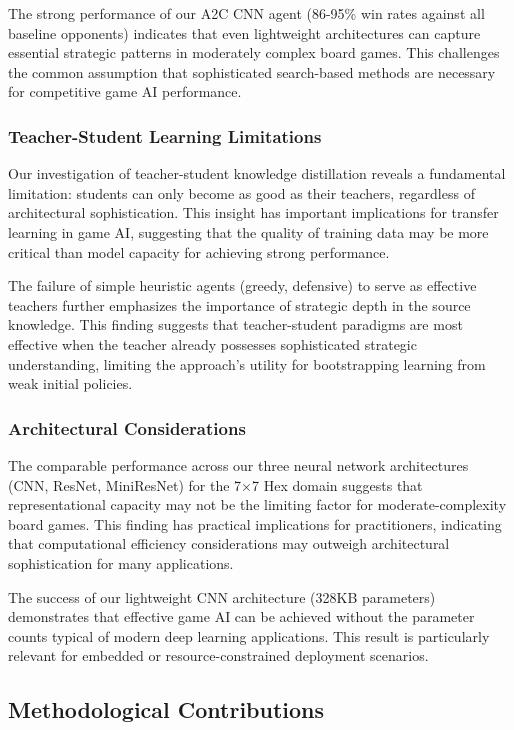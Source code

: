 \documentclass[conference]{IEEEtran}
\begin{document}
The strong performance of our A2C CNN agent (86-95\% win rates against all baseline opponents) indicates that even lightweight architectures can capture essential strategic patterns in moderately complex board games. This challenges the common assumption that sophisticated search-based methods are necessary for competitive game AI performance.

\subsubsection{Teacher-Student Learning Limitations}

Our investigation of teacher-student knowledge distillation reveals a fundamental limitation: students can only become as good as their teachers, regardless of architectural sophistication. This insight has important implications for transfer learning in game AI, suggesting that the quality of training data may be more critical than model capacity for achieving strong performance.

The failure of simple heuristic agents (greedy, defensive) to serve as effective teachers further emphasizes the importance of strategic depth in the source knowledge. This finding suggests that teacher-student paradigms are most effective when the teacher already possesses sophisticated strategic understanding, limiting the approach's utility for bootstrapping learning from weak initial policies.

\subsubsection{Architectural Considerations}

The comparable performance across our three neural network architectures (CNN, ResNet, MiniResNet) for the 7×7 Hex domain suggests that representational capacity may not be the limiting factor for moderate-complexity board games. This finding has practical implications for practitioners, indicating that computational efficiency considerations may outweigh architectural sophistication for many applications.

The success of our lightweight CNN architecture (328KB parameters) demonstrates that effective game AI can be achieved without the parameter counts typical of modern deep learning applications. This result is particularly relevant for embedded or resource-constrained deployment scenarios.

\subsection{Methodological Contributions}
\end{document}
